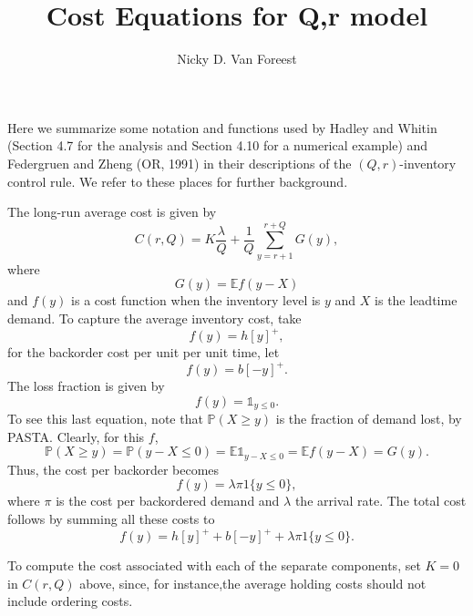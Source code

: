 \documentclass{article}
\title{Cost Equations for  Q,r model}
\author{Nicky D. Van Foreest}
\newcommand{\E}{\mathbb{E}}
\newcommand{\1}[1]{\mathbb{1}_{#1}}
\renewcommand{\P}{\mathbb{P}}
\begin{document}
\maketitle

Here we summarize some notation and functions used by Hadley and
Whitin (Section 4.7 for the analysis and Section 4.10 for a numerical
example) and Federgruen and Zheng (OR, 1991) in their descriptions of
the $(Q,r)$-inventory control rule. We refer to these places for
further background.

The long-run average cost is given by
\begin{equation*}
  C(r, Q) = K \frac{\lambda}{Q} + \frac1Q \sum_{y=r+1}^{r+Q} G(y),
\end{equation*}
where
\begin{equation*}
  G(y) = \E f(y-X)
\end{equation*}
and $f(y)$ is a cost function when the inventory level is $y$ and $X$
is the leadtime demand. To capture the average inventory cost, take
\begin{equation*}
   f(y) = h [y]^+,
\end{equation*}
for the backorder cost per unit per unit time, let
\begin{equation*}
   f(y) = b [-y]^+.
\end{equation*}
The loss fraction is given by
\begin{equation*}
   f(y) = \1{y\leq 0}.
\end{equation*}
To see this last equation, note that $\P(X\geq y)$ is the
fraction of demand lost, by PASTA. Clearly, for this $f$,
\begin{equation*}
\P(X\geq y) = \P(y-X \leq 0) = \E \1{y-X\leq 0} = \E f(y-X) = G(y).
\end{equation*}
Thus,  the cost per backorder becomes
\begin{equation*}
   f(y) = \lambda \pi 1\{y\leq 0\},
\end{equation*}
where $\pi$ is the cost per backordered demand and $\lambda$ the
arrival rate. The total cost follows by summing all these costs to
\begin{equation*}
   f(y) = h [y]^+ + b[-y]^+ + \lambda \pi 1\{y\leq 0\}.
\end{equation*}


To compute the cost associated with each of the separate components,
set $K=0$ in $C(r,Q)$ above, since, for instance,the average holding
costs should not include ordering costs.
\end{document}
